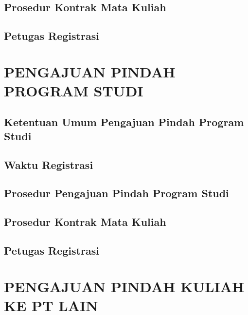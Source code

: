 \documentclass[
]{book}
\begin{document}
\hypertarget{prosedur-kontrak-mata-kuliah}{%
\section{Prosedur Kontrak Mata Kuliah}\label{prosedur-kontrak-mata-kuliah}}

\hypertarget{petugas-registrasi}{%
\section{Petugas Registrasi}\label{petugas-registrasi}}

\hypertarget{pengajuan-pindah-program-studi}{%
\chapter{PENGAJUAN PINDAH PROGRAM STUDI}\label{pengajuan-pindah-program-studi}}

\hypertarget{ketentuan-umum-pengajuan-pindah-program-studi}{%
\section{Ketentuan Umum Pengajuan Pindah Program Studi}\label{ketentuan-umum-pengajuan-pindah-program-studi}}

\hypertarget{waktu-registrasi}{%
\section{Waktu Registrasi}\label{waktu-registrasi}}

\hypertarget{prosedur-pengajuan-pindah-program-studi}{%
\section{Prosedur Pengajuan Pindah Program Studi}\label{prosedur-pengajuan-pindah-program-studi}}

\hypertarget{prosedur-kontrak-mata-kuliah}{%
\section{Prosedur Kontrak Mata Kuliah}\label{prosedur-kontrak-mata-kuliah}}

\hypertarget{petugas-registrasi}{%
\section{Petugas Registrasi}\label{petugas-registrasi}}

\hypertarget{pengajuan-pindah-kuliah-ke-pt-lain}{%
\chapter{PENGAJUAN PINDAH KULIAH KE PT LAIN}\label{pengajuan-pindah-kuliah-ke-pt-lain}}
\end{document}
